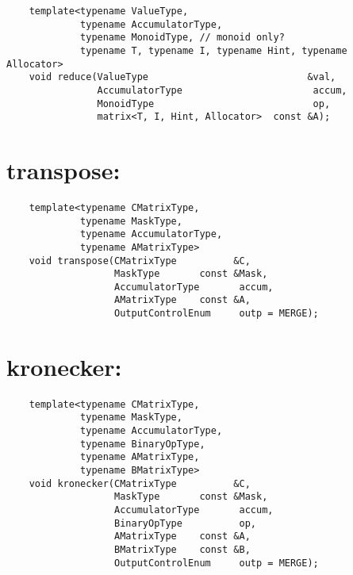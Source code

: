 \begin{verbatim}
    template<typename ValueType,
             typename AccumulatorType,
             typename MonoidType, // monoid only?
             typename T, typename I, typename Hint, typename Allocator>
    void reduce(ValueType                            &val,
                AccumulatorType                       accum,
                MonoidType                            op,
                matrix<T, I, Hint, Allocator>  const &A);
\end{verbatim}


\section{{\sf transpose}: }

\paragraph{\syntax}

\begin{verbatim}
    template<typename CMatrixType,
             typename MaskType,
             typename AccumulatorType,
             typename AMatrixType>
    void transpose(CMatrixType          &C,
                   MaskType       const &Mask,
                   AccumulatorType       accum,
                   AMatrixType    const &A,
                   OutputControlEnum     outp = MERGE);
\end{verbatim}


\section{{\sf kronecker}: }

\paragraph{\syntax}

\begin{verbatim}
    template<typename CMatrixType,
             typename MaskType,
             typename AccumulatorType,
             typename BinaryOpType,
             typename AMatrixType,
             typename BMatrixType>
    void kronecker(CMatrixType          &C,
                   MaskType       const &Mask,
                   AccumulatorType       accum,
                   BinaryOpType          op,
                   AMatrixType    const &A,
                   BMatrixType    const &B,
                   OutputControlEnum     outp = MERGE);
\end{verbatim}

